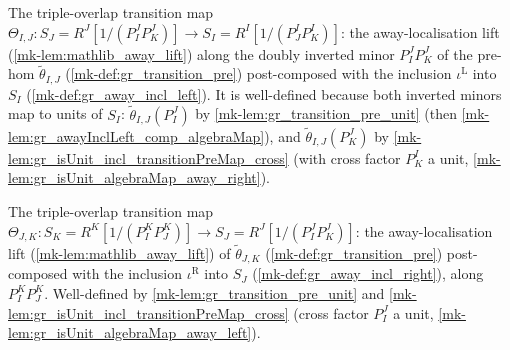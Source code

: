 \begin{definition}\label{mk-def:gr_cocycle_theta_ij}
  \leanok

  The triple-overlap transition map
  \(\Theta_{I,J} : S_J = R^J[1/(P^J_I P^J_K)] \to S_I = R^I[1/(P^I_J P^I_K)]\):
  the away-localisation lift (\ref{mk-lem:mathlib_away_lift}) along the doubly
  inverted minor \(P^J_I P^J_K\) of the pre-hom \(\tilde\theta_{I,J}\)
  (\ref{mk-def:gr_transition_pre}) post-composed with the inclusion
  \(\iota^{\mathrm{L}}\) into \(S_I\) (\ref{mk-def:gr_away_incl_left}). It is
  well-defined because both inverted minors map to units of \(S_I\):
  \(\tilde\theta_{I,J}(P^J_I)\) by \ref{mk-lem:gr_transition_pre_unit} (then
  \ref{mk-lem:gr_awayInclLeft_comp_algebraMap}), and \(\tilde\theta_{I,J}(P^J_K)\)
  by \ref{mk-lem:gr_isUnit_incl_transitionPreMap_cross} (with cross factor
  \(P^I_K\) a unit, \ref{mk-lem:gr_isUnit_algebraMap_away_right}).
\end{definition}

\begin{definition}\label{mk-def:gr_cocycle_theta_jk}
  \leanok

  The triple-overlap transition map
  \(\Theta_{J,K} : S_K = R^K[1/(P^K_I P^K_J)] \to S_J = R^J[1/(P^J_I P^J_K)]\):
  the away-localisation lift (\ref{mk-lem:mathlib_away_lift}) of
  \(\tilde\theta_{J,K}\) (\ref{mk-def:gr_transition_pre}) post-composed with the
  inclusion \(\iota^{\mathrm{R}}\) into \(S_J\) (\ref{mk-def:gr_away_incl_right}),
  along \(P^K_I P^K_J\). Well-defined by \ref{mk-lem:gr_transition_pre_unit} and
  \ref{mk-lem:gr_isUnit_incl_transitionPreMap_cross} (cross factor \(P^J_I\) a
  unit, \ref{mk-lem:gr_isUnit_algebraMap_away_left}).
\end{definition}

